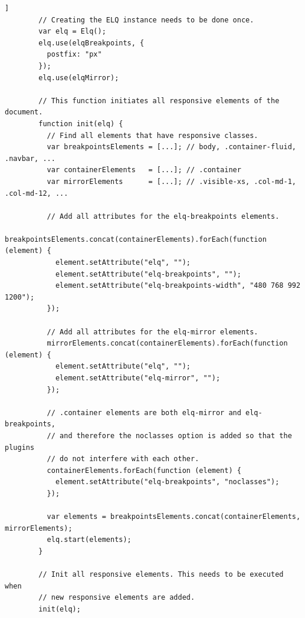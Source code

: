 \documentclass[a4paper,11pt]{kth-mag}
\begin{document}
      \begin{lstlisting}[gobble=8,label={code:bootstrap-init-js},caption={Example of \gls{JavaScript} code that adds the required \gls{ELQ} attributes dynamically to all \gls{responsive} \glspl{element} and initializes them.},captionpos=b]]
        // Creating the ELQ instance needs to be done once.
        var elq = Elq();
        elq.use(elqBreakpoints, {
          postfix: "px"
        });
        elq.use(elqMirror);

        // This function initiates all responsive elements of the document.
        function init(elq) {
          // Find all elements that have responsive classes.
          var breakpointsElements = [...]; // body, .container-fluid, .navbar, ...
          var containerElements   = [...]; // .container
          var mirrorElements      = [...]; // .visible-xs, .col-md-1, .col-md-12, ...

          // Add all attributes for the elq-breakpoints elements.
          breakpointsElements.concat(containerElements).forEach(function (element) {
            element.setAttribute("elq", "");
            element.setAttribute("elq-breakpoints", "");
            element.setAttribute("elq-breakpoints-width", "480 768 992 1200");
          });

          // Add all attributes for the elq-mirror elements.
          mirrorElements.concat(containerElements).forEach(function (element) {
            element.setAttribute("elq", "");
            element.setAttribute("elq-mirror", "");
          });

          // .container elements are both elq-mirror and elq-breakpoints,
          // and therefore the noclasses option is added so that the plugins 
          // do not interfere with each other.
          containerElements.forEach(function (element) {
            element.setAttribute("elq-breakpoints", "noclasses");
          });

          var elements = breakpointsElements.concat(containerElements, mirrorElements);
          elq.start(elements);
        }

        // Init all responsive elements. This needs to be executed when 
        // new responsive elements are added.
        init(elq);
      \end{lstlisting}
\end{document}
